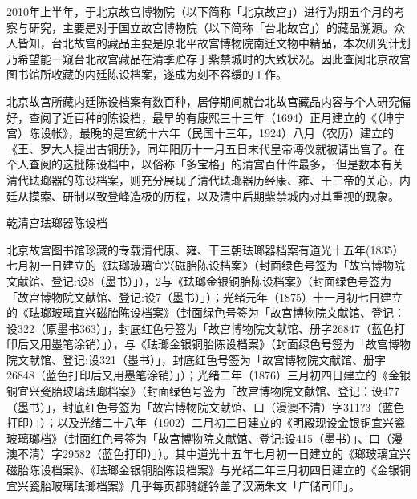 
2010年上半年，于北京故宫博物院（以下简称「北京故宫」）进行为期五个月的考察与研究，主要是对于国立故宫博物院（以下简称「台北故宫」）的藏品溯源。众人皆知，台北故宫的藏品主要是原北平故宫博物院南迁文物中精品，本次研究计划乃希望能一窥台北故宫藏品在清季贮存于紫禁城时的大致状况。因此查阅北京故宫图书馆所收藏的内廷陈设档案，遂成为刻不容缓的工作。

北京故宫所藏内廷陈设档案有数百种，居停期间就台北故宫藏品内容与个人研究偏好，查阅了近百种的陈设档，最早的有康熙三十三年（1694）正月建立的《（坤宁宫）陈设帐》，最晚的是宣统十六年（民国十三年，1924）八月（农历）建立的《王、罗大人提出古铜册》，同年阳历十一月五日末代皇帝溥仪就被请出宫了。在个人查阅的这批陈设档中，以俗称「多宝格」的清宫百什件最多，¹但是数本有关清代珐瑯器的陈设档案，则充分展现了清代珐瑯器历经康、雍、干三帝的关心，内廷从摸索、研制以致登峰造极的历程，以及清中后期紫禁城内对其重视的现象。

\vfill
\begin{BookNotes}
\end{BookNotes}

\noindent 乾清宫珐瑯器陈设档

北京故宫图书馆珍藏的专载清代康、雍、干三朝珐瑯器档案有道光十五年(1835）七月初一日建立的《珐瑯玻璃宜兴磁胎陈设档案》（封面绿色号签为「故宫博物院文献馆、登记:设8（墨书）」），2与《珐瑯金银铜胎陈设档案》（封面绿色号签为「故宫博物院文献馆、登记:设7（墨书）」）；光绪元年（1875）十一月初七日建立的《珐瑯玻璃宜兴磁胎陈设档案》（封面绿色号签为「故宫博物院文献馆、登记：设322（原墨书363）」，封底红色号签为「故宫博物院文献馆、册字26847（蓝色打印后又用墨笔涂销）」），与《珐瑯金银铜胎陈设档案》（封面绿色号签为「故宫博物院文献馆、登记:设321（墨书）」，封底红色号签为「故宫博物院文献馆、册字26848（蓝色打印后又用墨笔涂销）」）；光绪二年（1876）三月初四日建立的《金银铜宜兴瓷胎玻璃珐瑯档案》（封面绿色号签为「故宫博物院文献馆、登记：设477（墨书）」，封底红色号签为「故宫博物院文献馆、口（漫澳不清）字311?3（蓝色打印）」）；以及光绪二十八年（1902）二月初二日建立的《明殿现设金银铜宜兴瓷玻璃瑯档》（封面红色号签为「故宫博物院文献馆、登记:设415（墨书）」、口（漫澳不清）字29582（蓝色打印）」）。其中道光十五年七月初一日建立的《瑯玻璃宜兴磁胎陈设档案》、《珐瑯金银铜胎陈设档案》与光绪二年三月初四日建立的《金银铜宜兴瓷胎玻璃珐瑯档案》几乎每页都骑缝钤盖了汉满朱文「广储司印」。

